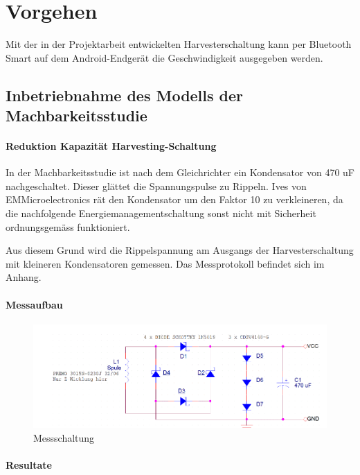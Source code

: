 \chapter{Vorgehen}
Mit der in der Projektarbeit entwickelten Harvesterschaltung kann per Bluetooth Smart auf dem Android-Endgerät die Geschwindigkeit ausgegeben werden.

\section{Inbetriebnahme des Modells der Machbarkeitsstudie}



\subsubsection{Reduktion Kapazität Harvesting-Schaltung}
In der Machbarkeitsstudie ist nach dem Gleichrichter ein Kondensator von 470 uF nachgeschaltet. Dieser glättet die Spannungspulse zu Rippeln. Ives von EMMicroelectronics rät den Kondensator um den Faktor 10 zu verkleineren, da die nachfolgende Energiemanagementschaltung sonst nicht mit Sicherheit ordnungsgemäss funktioniert. 

Aus diesem Grund wird die Rippelspannung am Ausgangs der Harvesterschaltung mit kleineren Kondensatoren gemessen. Das Messprotokoll befindet sich im Anhang.

\subsubsection*{Messaufbau}

\begin{figure}
\includegraphics[bb = 0 0 100 100]{3Vorgehen/imag/messschaltungHarvesterschaltung.gif}
\caption{Messschaltung}
\end{figure}

\subsubsection*{Resultate}

